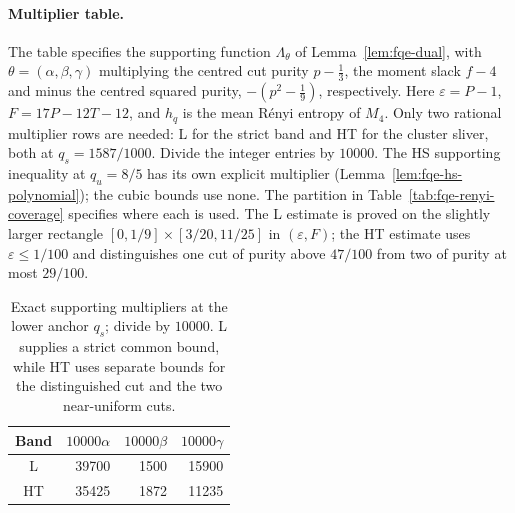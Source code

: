 \paragraph{Multiplier table.}
The table specifies the supporting function $\Lambda_\theta$ of Lemma~\ref{lem:fqe-dual}, with
$\theta=(\alpha,\beta,\gamma)$ multiplying the centred cut purity $p-\frac13$, the moment slack $f-4$ and minus
the centred squared purity, $-(p^2-\frac19)$, respectively. Here $\varepsilon=P-1$, $F=17P-12T-12$, and $h_q$ is the mean R\'enyi entropy of $M_4$.
Only two rational multiplier rows are needed: L for the strict band and HT
for the cluster sliver, both at $q_s=1587/1000$. Divide the integer entries
by $10000$. The HS supporting inequality at $q_u=8/5$ has its own explicit
multiplier (Lemma~\ref{lem:fqe-hs-polynomial}); the cubic bounds use none.
The partition in Table~\ref{tab:fqe-renyi-coverage} specifies where each is used.
The L estimate is proved on the slightly larger rectangle
$[0,1/9]\times[3/20,11/25]$ in $(\varepsilon,F)$; the HT estimate uses
$\varepsilon\le1/100$ and distinguishes one cut of purity above $47/100$
from two of purity at most $29/100$.
\begin{table}[htbp]
\centering\small
\begin{tabular}{crrr}
\toprule
Band&$10000\alpha$&$10000\beta$&$10000\gamma$\\
\midrule
L&39700&1500&15900\\
\midrule
HT&35425&1872&11235\\
\bottomrule
\end{tabular}
\caption{Exact supporting multipliers at the lower anchor $q_s$; divide
by $10000$. L supplies a strict common bound, while HT uses separate bounds
for the distinguished cut and the two near-uniform cuts.}
\label{tab:fqe-dual-co}
\end{table}

